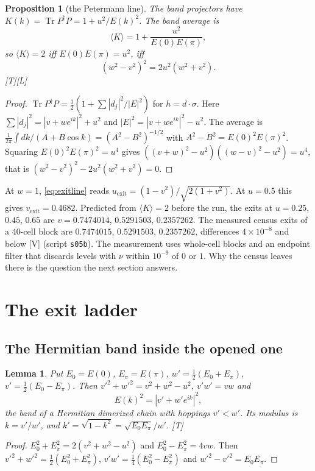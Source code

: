 \documentclass[11pt]{article}
\newtheorem{proposition}[theorem]{Proposition}
\newtheorem{lemma}[theorem]{Lemma}
\theoremstyle{definition}
\newcommand{\grade}[1]{\textsf{\small[#1]}}
\newcommand{\Tr}{\operatorname{Tr}}
\begin{document}
\begin{proposition}[the Petermann line]\label{prop:petermann}
The band projectors have $K(k)=\Tr P^\dagger P=1+u^2/E(k)^2$. The band average is
\[
\langle K\rangle=1+\frac{u^2}{E(0)E(\pi)},
\]
so $\langle K\rangle=2$ iff $E(0)E(\pi)=u^2$, iff
\begin{equation}\label{eq:exitline}
(w^2-v^2)^2=2u^2(w^2+v^2).
\end{equation}
\grade{T}\grade{L}
\end{proposition}
\begin{proof}
$\Tr P^\dagger P=\tfrac12(1+\sum|d_j|^2/|E|^2)$ for $h=d\cdot\sigma$. Here $\sum|d_j|^2=|v+we^{ik}|^2+u^2$ and $|E|^2=|v+we^{ik}|^2-u^2$. The average is $\frac1{2\pi}\int dk/(A+B\cos k)=(A^2-B^2)^{-1/2}$ with $A^2-B^2=E(0)^2E(\pi)^2$. Squaring $E(0)^2E(\pi)^2=u^4$ gives $((v+w)^2-u^2)((w-v)^2-u^2)=u^4$, that is $(w^2-v^2)^2-2u^2(w^2+v^2)=0$.
\end{proof}
At $w=1$, \eqref{eq:exitline} reads $u_{\mathrm{exit}}=(1-v^2)/\sqrt{2(1+v^2)}$. At $u=0.5$ this gives $v_{\mathrm{exit}}=0.4682$. Predicted from $\langle K\rangle=2$ before the run, the exits at $u=0.25$, $0.45$, $0.65$ are $v=0.7474014$, $0.5291503$, $0.2357262$. The measured census exits of a 40-cell block are $0.7474015$, $0.5291503$, $0.2357262$, differences $4\times10^{-8}$ and below \grade{V} (script \texttt{s05b}). The measurement uses whole-cell blocks and an endpoint filter that discards levels with $\nu$ within $10^{-9}$ of $0$ or $1$. Why the census leaves there is the question the next section answers.

\section{The exit ladder}\label{sec:ladder}
\subsection{The Hermitian band inside the opened one}
\begin{lemma}\label{lem:band}
Put $E_0=E(0)$, $E_\pi=E(\pi)$, $w'=\tfrac12(E_0+E_\pi)$, $v'=\tfrac12(E_0-E_\pi)$. Then $v'^2+w'^2=v^2+w^2-u^2$, $v'w'=vw$ and
\[
E(k)^2=|v'+w'e^{ik}|^2,
\]
the band of a Hermitian dimerized chain with hoppings $v'<w'$. Its modulus is $k=v'/w'$, and $k'=\sqrt{1-k^2}=\sqrt{E_0E_\pi}/w'$. \grade{T}
\end{lemma}
\begin{proof}
$E_0^2+E_\pi^2=2(v^2+w^2-u^2)$ and $E_0^2-E_\pi^2=4vw$. Then $v'^2+w'^2=\tfrac12(E_0^2+E_\pi^2)$, $v'w'=\tfrac14(E_0^2-E_\pi^2)$ and $w'^2-v'^2=E_0E_\pi$.
\end{proof}
\end{document}
